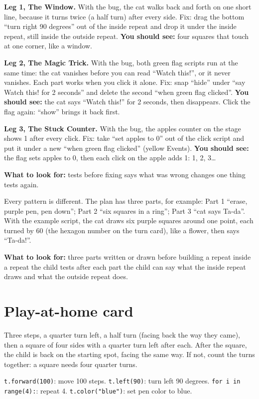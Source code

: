 \begin{answer}
\textbf{Leg 1, The Window.} With the bug, the cat walks back and forth on one short line, because it turns twice (a half turn) after every side. Fix: drag the bottom \enquote{turn right 90 degrees} out of the inside repeat and drop it under the inside repeat, still inside the outside repeat. \textbf{You should see:} four squares that touch at one corner, like a window.

\textbf{Leg 2, The Magic Trick.} With the bug, both green flag scripts run at the same time: the cat vanishes before you can read \enquote{Watch this!}, or it never vanishes. Each part works when you click it alone. Fix: snap \enquote{hide} under \enquote{say Watch this! for 2 seconds} and delete the second \enquote{when green flag clicked}. \textbf{You should see:} the cat says \enquote{Watch this!} for 2 seconds, then disappears. Click the flag again: \enquote{show} brings it back first.

\textbf{Leg 3, The Stuck Counter.} With the bug, the apples counter on the stage shows 1 after every click. Fix: take \enquote{set apples to 0} out of the click script and put it under a new \enquote{when green flag clicked} (yellow Events). \textbf{You should see:} the flag sets apples to 0, then each click on the apple adds 1: 1, 2, 3\ldots

\textbf{What to look for:} \tickbox{} tests before fixing \quad \tickbox{} says what was wrong \quad \tickbox{} changes one thing \quad \tickbox{} tests again.
\end{answer}

\begin{answer}
Every pattern is different. The plan has three parts, for example: Part 1 \enquote{erase, purple pen, pen down}; Part 2 \enquote{six squares in a ring}; Part 3 \enquote{cat says Ta-da}. With the example script, the cat draws six purple squares around one point, each turned by 60 (the hexagon number on the turn card), like a flower, then says \enquote{Ta-da!}.

\textbf{What to look for:} \tickbox{} three parts written or drawn before building \quad \tickbox{} a repeat inside a repeat \quad \tickbox{} the child tests after each part \quad \tickbox{} the child can say what the inside repeat draws and what the outside repeat does.
\end{answer}

\section{Play-at-home card}
\begin{answer}
Three steps, a quarter turn left, a half turn (facing back the way they came), then a square of four sides with a quarter turn left after each. After the square, the child is back on the starting spot, facing the same way. If not, count the turns together: a square needs four quarter turns.
\end{answer}

\begin{answer}
\texttt{t.forward(100)}: move 100 steps. \texttt{t.left(90)}: turn left 90 degrees. \texttt{for i in range(4):}: repeat 4. \texttt{t.color("blue")}: set pen color to blue.
\end{answer}
